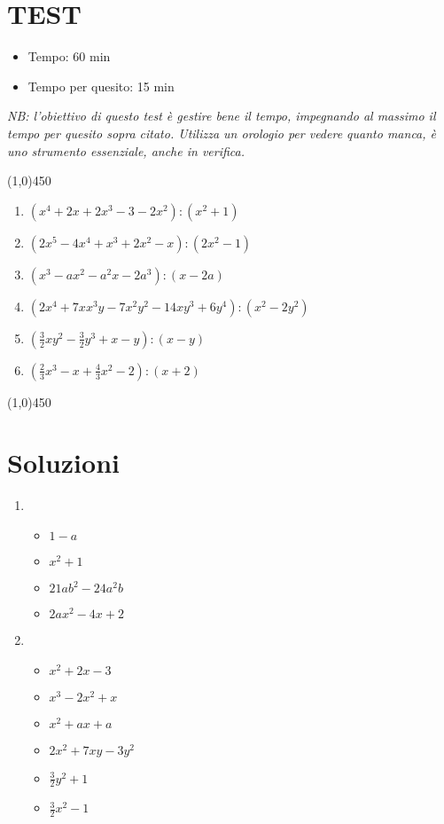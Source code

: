 \documentclass[a4paper]{article}
\begin{document}
\newpage
\section{TEST }
\begin{itemize}
	\item Tempo: 60 min
	\item Tempo per quesito: 15 min 
\end{itemize}
\textit{NB: l'obiettivo di questo test è gestire bene il tempo, impegnando al massimo il tempo per quesito sopra citato. Utilizza un orologio per vedere quanto manca, è uno strumento essenziale, anche in verifica.}
\begin{center}
	\line(1,0){450}
\end{center}
\begin{enumerate}
	\item $(x^4+2x+2x^3-3-2x^2):(x^2+1)$
	\item $(2x^5-4x^4+x^3+2x^2-x):(2x^2-1)$
	\item $(x^3-ax^2-a^2x-2a^3):(x-2a)$
	\item $(2x^4+7xx^3y-7x^2y^2-14xy^3+6y^4):(x^2-2y^2)$
	\item $(\frac{3}{2}xy^2-\frac{3}{2}y^3+x-y):(x-y)$
	\item $(\frac{2}{3}x^3-x+\frac{4}{3}x^2-2):(x+2)$
\end{enumerate}
\begin{center}
	\line(1,0){450}
\end{center}





















\twocolumn
\section{Soluzioni}
\begin{enumerate}
\item 	\begin{itemize}
		\item $1-a$
		\item $x^2+1$
		\item $21ab^2-24a^2b$
		\item $2ax^2-4x+2$
	\end{itemize}
\item 	\begin{itemize}
		\item $x^2+2x-3$
		\item $x^3-2x^2+x$
		\item $x^2+ax+a$
		\item $2x^2+7xy-3y^2$
		\item $\frac{3}{2}y^2+1$
		\item $\frac{3}{2}x^2-1$
\end{itemize}
\end{enumerate}
\end{document}
